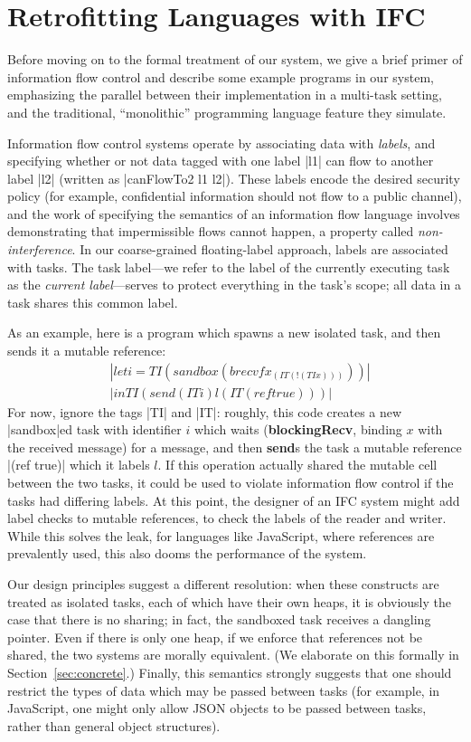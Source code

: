 \section{Retrofitting Languages with IFC}
\label{sec:retrofit}

Before moving on to the formal treatment of our system, we give
a brief primer of information flow control and describe some example programs
in our system, emphasizing the parallel between their implementation
in a multi-task setting, and the traditional, ``monolithic'' programming
language feature they simulate.

Information flow control systems operate by associating data with \emph{labels},
and specifying whether or not data tagged with one label |l1| can flow
to another
label |l2| (written as |canFlowTo2 l1 l2|).  These labels encode the desired
security policy (for example, confidential information should not flow to
a public channel), and the work of specifying the semantics of an information
flow language involves demonstrating that impermissible flows cannot happen,
a property called \emph{non-interference}.
%
In our coarse-grained floating-label approach, labels are associated with tasks.
%
The task label---we refer to the label of the currently executing task as the
\emph{current label}---serves to protect everything in the task's scope;
all data in a task shares this common label.

As an example, here is a program which spawns a new isolated task,
and then sends it a mutable reference:
\begin{align*}
    & |let i = TI (sandbox (brecvf x _ (IT (!(TI x)))))|\\
    & |in TI (send (IT i) l (IT (ref true)))|
\end{align*}
For now, ignore the tags |TI| and |IT|: roughly, this code creates a new
|sandbox|ed task with identifier $i$ which waits (\textbf{blockingRecv}, binding $x$ with the received message) for a
message, and then \textbf{send}s the task a mutable reference |(ref
true)| which it labels $l$.  If this operation actually shared the mutable cell between the two tasks, it
could be used to violate information flow control if the tasks had
differing labels.  At this point, the designer of an IFC system might
add label checks to mutable references, to check the labels of the
reader and writer. While this solves the leak, for languages like
JavaScript, where references are prevalently used, this also dooms the
performance of the system.

Our design principles suggest a different resolution: when these
constructs are treated as isolated tasks, each of which have their own heaps, it
is obviously the case that there is no sharing; in fact, the sandboxed task receives a dangling pointer.  Even if there is only one heap, if we enforce that references
not be shared, the two systems are morally equivalent. (We elaborate on
this formally in Section~\ref{sec:concrete}.)  Finally, this
semantics strongly suggests that one should restrict the types of
data which may be passed between tasks (for example, in JavaScript, one
might only allow JSON objects to be passed between tasks, rather than
general object structures).

